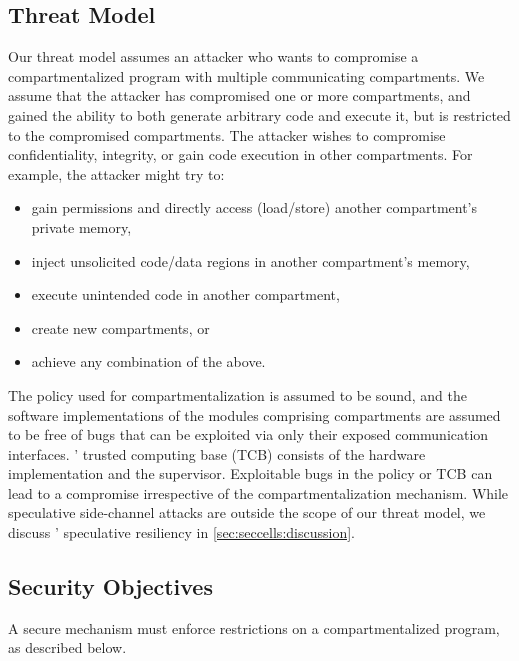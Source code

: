\subsection{Threat Model}
\label{sec:reqs:threat}

Our threat model assumes an attacker who wants to compromise a 
compartmentalized program with multiple communicating compartments.
We assume that the attacker has compromised one or more compartments, and
gained the ability to both generate arbitrary code and execute it,
but is restricted to the compromised compartments.
The attacker wishes to compromise confidentiality, integrity, or 
gain code execution in other compartments.
%
For example, the attacker might try to:
\begin{itemize}
  \item gain permissions and directly access (load/store) 
        another compartment's private memory,
  \item inject unsolicited code/data regions in another 
        compartment's memory,
  \item execute unintended code in another compartment,
  \item create new compartments, or
  \item achieve any combination of the above.
\end{itemize}

The policy used for compartmentalization is assumed to be sound, and the software
implementations of the modules comprising compartments are assumed to be
free of bugs that can be exploited via only their exposed communication
interfaces.
\seccells' trusted computing base (TCB) consists of the hardware implementation
and the supervisor.
Exploitable bugs in the policy or TCB can lead to a compromise irrespective of the
compartmentalization mechanism.
While speculative side-channel attacks are outside the scope of our threat model,
we discuss \seccells' speculative resiliency in \autoref{sec:seccells:discussion}.

\subsection{Security Objectives}
\label{sec:reqs:security}
A secure mechanism must enforce restrictions on a compartmentalized program,
as described below.

